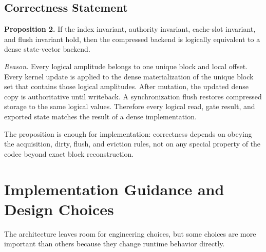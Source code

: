 \documentclass[runningheads]{llncs}
\begin{document}
\subsection{Correctness Statement}

\textbf{Proposition 2.} If the index invariant, authority invariant, cache-slot invariant, and flush invariant hold, then the compressed backend is logically equivalent to a dense state-vector backend.

\textit{Reason.} Every logical amplitude belongs to one unique block and local offset. Every kernel update is applied to the dense materialization of the unique block set that contains those logical amplitudes. After mutation, the updated dense copy is authoritative until writeback. A synchronization flush restores compressed storage to the same logical values. Therefore every logical read, gate result, and exported state matches the result of a dense implementation.

The proposition is enough for implementation: correctness depends on obeying the acquisition, dirty, flush, and eviction rules, not on any special property of the codec beyond exact block reconstruction.

\section{Implementation Guidance and Design Choices}

The architecture leaves room for engineering choices, but some choices are more important than others because they change runtime behavior directly.
\end{document}

